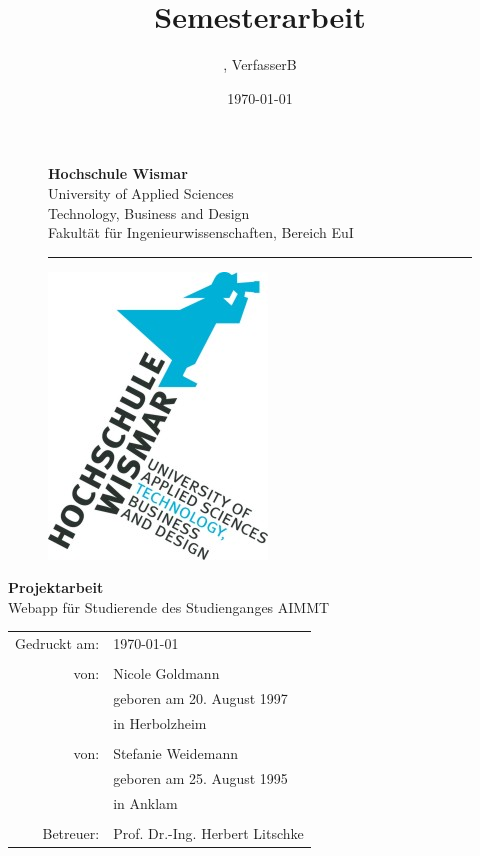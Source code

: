 \documentclass[12pt,					%
							 oneside,			%
							 a4paper,			%
							 halfparskip,		%
							 liststotoc,			%
							 bibtotoc,			%
							 fleqn,				%
							 pointlessnumbers]	%
							 {scrreprt}
\title{Semesterarbeit}
\author{\VerfasserA, VerfasserB}
\date{\today{}}
\newcommand{\VerfasserA}{Nicole Goldmann}
\newcommand{\GeburtstagA}{20. August 1997}
\newcommand{\GeburtsortA}{Herbolzheim}
\newcommand{\VerfasserB}{Stefanie Weidemann}
\newcommand{\GeburtstagB}{25. August 1995}
\newcommand{\GeburtsortB}{Anklam}
\newcommand{\Titel}{Webapp für Studierende des Studienganges AIMMT}
\newcommand{\Betreuer}{Prof. Dr.-Ing. Herbert Litschke}
\begin{document}

	\renewcommand\lstlistingname{Code}
	\renewcommand\lstlistlistingname{Codeverzeichnis}
	
	\begin{titlepage}
		\setlength\headsep{-5mm}
		\begin{figure}[!h]
			\begin{minipage}{0.8\textwidth}
				\textbf{Hochschule Wismar} \\
				University of Applied Sciences \\
				Technology, Business and Design \\
				Fakultät für Ingenieurwissenschaften, Bereich EuI \\
			\rule{\textwidth}{0.5pt}
			\end{minipage}
			\begin{minipage}[r]{0.1\textwidth}
				\begin{flushright}
					\includegraphics[height=6\baselineskip]{pictures/HS-Wismar_Logo-FIW_2010-01.jpg}
				\end{flushright}
			\end{minipage}
		\end{figure}
		\vspace*{6cm}
		\begin{center}
			\Huge
			\textbf{Projektarbeit} \\
			\vspace{2cm}
			\large \Titel
			\begin{table}[b]
				\begin{tabular}{rl}
					Gedruckt am: & \today \\
					\\
					von: & \VerfasserA \\
					& geboren am \GeburtstagA \\
					& in \GeburtsortA \\
					\\
					von: & \VerfasserB \\
					& geboren am \GeburtstagB \\
					& in \GeburtsortB \\
					\\
					Betreuer: & \Betreuer \\

				\end{tabular}
			\end{table}
		\end{center}
	\end{titlepage}
\end{document}
